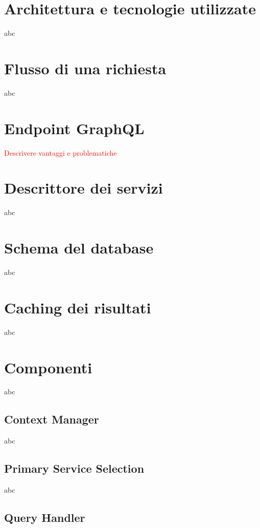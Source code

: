 \section{Architettura e tecnologie utilizzate}

abc

\section{Flusso di una richiesta}

abc

\section{Endpoint GraphQL}

\textcolor{red}{Descrivere vantaggi e problematiche}

\section{Descrittore dei servizi}

abc

\section{Schema del database}

abc

\section{Caching dei risultati}

abc

\section{Componenti}

abc

\subsection{Context Manager}

abc

\subsection{Primary Service Selection\label{sec:primary-service-selection}}

abc

\subsection{Query Handler}

